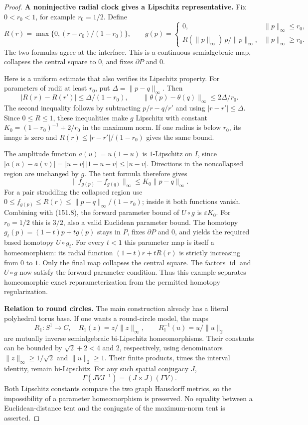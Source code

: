 \begin{proof}
\textbf{A noninjective radial clock gives a Lipschitz representative.}
Fix $0<r_0<1$, for example $r_0=1/2$. Define
\[
 R(r)=\max\{0,(r-r_0)/(1-r_0)\},\qquad
 g(p)=
 \begin{cases}
 0,&\|p\|_\infty\le r_0,\\
 R(\|p\|_\infty)\,p/\|p\|_\infty,
                         &\|p\|_\infty\ge r_0 .
 \end{cases}
 \tag{151.15}
\]
The two formulas agree at the interface. This is a continuous
semialgebraic map, collapses the central square to $0$, and fixes
$\partial P$ and $0$.

Here is a uniform estimate that also verifies its Lipschitz property.
For parameters of radii at least $r_0$, put
$\Delta=\|p-q\|_\infty$. Then
\[
 |R(r)-R(r')|\le\Delta/(1-r_0),\qquad
       \|\theta(p)-\theta(q)\|_\infty\le2\Delta/r_0.
 \tag{151.16}
\]
The second inequality follows by subtracting $p/r-q/r'$ and
using $|r-r'|\le\Delta$. Since $0\le R\le1$, these inequalities
make $g$ Lipschitz with constant
$K_0=(1-r_0)^{-1}+2/r_0$ in the maximum norm.
If one radius is below $r_0$, its image is zero and
$R(r)\le|r-r'|/(1-r_0)$ gives the same bound.

The amplitude function $a(u)=u(1-u)$ is $1$-Lipschitz on $I$,
since $|a(u)-a(v)|=|u-v|\,|1-u-v|\le|u-v|$.
Directions in the noncollapsed region are unchanged by $g$.
The tent formula therefore gives
\[
             \|f_{g(p)}-f_{g(q)}\|_\infty
                                     \le K_0\|p-q\|_\infty.
 \tag{151.17}
\]
For a pair straddling the collapsed region use
$0\le f_{g(p)}\le R(r)\le
 \|p-q\|_\infty/(1-r_0)$; inside it both functions vanish.
Combining with (151.8), the forward parameter bound of
$U\circ g$ is $\varepsilon K_0$.
For $r_0=1/2$ this is $3/2$, also a valid Euclidean
parameter bound. The homotopy
$g_t(p)=(1-t)p+tg(p)$ stays in $P$, fixes $\partial P$ and $0$,
and yields the required based homotopy $U\circ g_t$.
For every $t<1$ this parameter map is itself a homeomorphism:
its radial function $(1-t)r+tR(r)$ is strictly increasing from
$0$ to $1$. Only the final map collapses the central square.
The factors $\operatorname{id}$ and $U\circ g$ now satisfy
the forward parameter condition. Thus this example separates
homeomorphic exact reparameterization from the permitted homotopy
regularization.

\textbf{Relation to round circles.}
The main construction already has a literal polyhedral torus base.
If one wants a round-circle model, the maps
\[
 R_1:S^1\to C,\quad R_1(z)=z/\|z\|_\infty,\qquad
 R_1^{-1}(u)=u/\|u\|_2
 \tag{151.18}
\]
are mutually inverse semialgebraic bi-Lipschitz homeomorphisms.
Their constants can be bounded by $\sqrt2+2<4$ and $2$,
respectively, using denominators $\|z\|_\infty\ge1/\sqrt2$
and $\|u\|_2\ge1$. Their finite products, times the interval
identity, remain bi-Lipschitz. For any such spatial conjugacy $J$,
\[
        \Gamma(JVJ^{-1})=(J\times J)(\Gamma V).
\]
Both Lipschitz constants compare the two graph Hausdorff metrics,
so the impossibility of a parameter homeomorphism is preserved.
No equality between a Euclidean-distance tent and the conjugate
of the maximum-norm tent is asserted.
\end{proof}


